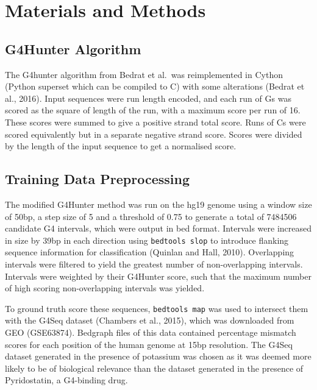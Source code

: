 \documentclass[12pt,a4paper,]{report}
\begin{document}
\newpage

\hypertarget{materials-and-methods}{%
\section{Materials and Methods}\label{materials-and-methods}}

\hypertarget{g4hunter-algorithm}{%
\subsection{G4Hunter Algorithm}\label{g4hunter-algorithm}}

The G4hunter algorithm from Bedrat et al.~was reimplemented in Cython
(Python superset which can be compiled to C) with some alterations
(Bedrat et al., 2016). Input sequences were run length encoded, and each
run of Gs was scored as the square of length of the run, with a maximum
score per run of 16. These scores were summed to give a positive strand
total score. Runs of Cs were scored equivalently but in a separate
negative strand score. Scores were divided by the length of the input
sequence to get a normalised score.

\hypertarget{training-data-preprocessing}{%
\subsection{Training Data
Preprocessing}\label{training-data-preprocessing}}

The modified G4Hunter method was run on the hg19 genome using a window
size of 50bp, a step size of 5 and a threshold of 0.75 to generate a
total of 7484506 candidate G4 intervals, which were output in bed
format. Intervals were increased in size by 39bp in each direction using
\texttt{bedtools\ slop} to introduce flanking sequence information for
classification (Quinlan and Hall, 2010). Overlapping intervals were
filtered to yield the greatest number of non-overlapping intervals.
Intervals were weighted by their G4Hunter score, such that the maximum
number of high scoring non-overlapping intervals was yielded.

To ground truth score these sequences, \texttt{bedtools\ map} was used
to intersect them with the G4Seq dataset (Chambers et al., 2015), which
was downloaded from GEO (GSE63874). Bedgraph files of this data
contained percentage mismatch scores for each position of the human
genome at 15bp resolution. The G4Seq dataset generated in the presence
of potassium was chosen as it was deemed more likely to be of biological
relevance than the dataset generated in the presence of Pyridostatin, a
G4-binding drug.
\end{document}
